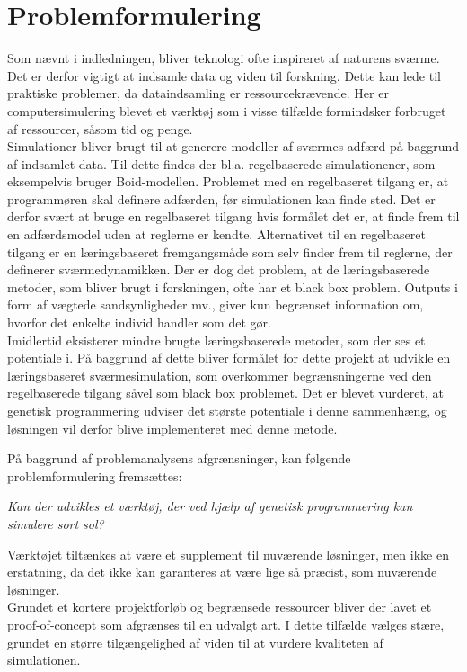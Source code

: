 \chapter{Problemformulering}\label{ch:problemformulering}
Som nævnt i indledningen, bliver teknologi ofte inspireret af naturens sværme. Det er derfor vigtigt at indsamle data og viden til forskning. Dette kan lede til praktiske problemer, da dataindsamling er ressourcekrævende. Her er computersimulering blevet et værktøj som i visse tilfælde formindsker forbruget af ressourcer, såsom tid og penge.
\\
Simulationer bliver brugt til at generere modeller af sværmes adfærd på baggrund af indsamlet data. Til dette findes der bl.a. regelbaserede simulationener, som eksempelvis bruger Boid-modellen. Problemet med en regelbaseret tilgang er, at programmøren skal definere adfærden, før simulationen kan finde sted. Det er derfor svært at bruge en regelbaseret tilgang hvis formålet det er, at finde frem til en adfærdsmodel uden at reglerne er kendte. Alternativet til en regelbaseret tilgang er en læringsbaseret fremgangsmåde som selv finder frem til reglerne, der definerer sværmedynamikken. Der er dog det problem, at de læringsbaserede metoder, som bliver brugt i forskningen, ofte har et black box problem. Outputs i form af vægtede sandsynligheder mv., giver kun begrænset information om, hvorfor det enkelte individ handler som det gør.
\\
Imidlertid eksisterer mindre brugte læringsbaserede metoder, som der ses et potentiale i. På baggrund af dette bliver formålet for dette projekt at udvikle en læringsbaseret sværmesimulation, som overkommer begrænsningerne ved den regelbaserede tilgang såvel som black box problemet. Det er blevet vurderet, at genetisk programmering udviser det største potentiale i denne sammenhæng, og løsningen vil derfor blive implementeret med denne metode.
\par 
På baggrund af problemanalysens afgrænsninger, kan følgende problemformulering fremsættes:
\par
\textit{Kan der udvikles et værktøj, der ved hjælp af genetisk programmering kan simulere sort sol?}
\par
Værktøjet tiltænkes at være et supplement til nuværende løsninger, men ikke en erstatning, da det ikke kan garanteres at være lige så præcist, som nuværende løsninger.
\\
Grundet et kortere projektforløb og begrænsede ressourcer bliver der lavet et proof-of-concept som afgrænses til en udvalgt art. I dette tilfælde vælges stære, grundet en større tilgængelighed af viden til at vurdere kvaliteten af simulationen.
\par

